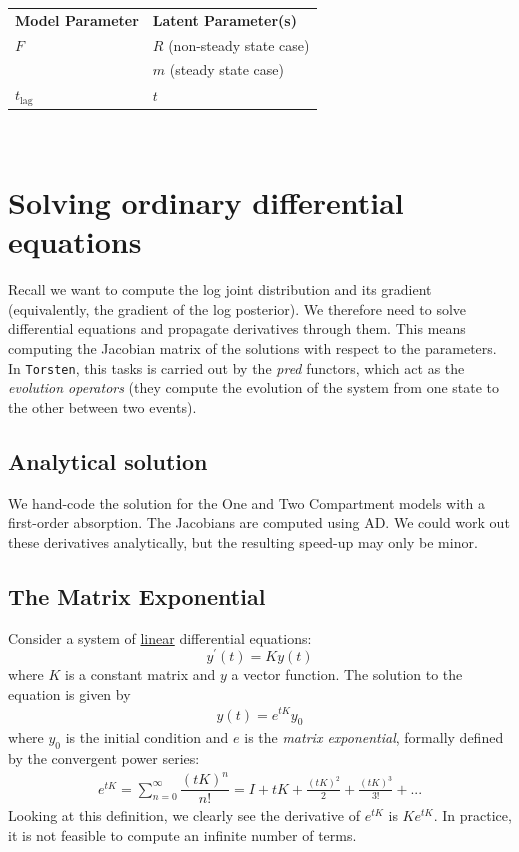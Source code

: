 \documentclass[11pt]{article}
\begin{document}
\begin{center}
  \begin{tabular}{l l}
  \rowcolor[gray]{0.95} \textbf{Model Parameter} & \textbf{Latent Parameter(s)} \\
    $F$ & $R$ (non-steady state case) \\
         &  $m$  (steady state case) \\ 
  \rowcolor[gray]{0.95} $t_\mathrm{lag}$ & $t$ \\
  \end{tabular} \\
\end{center}


\section{Solving ordinary differential equations}

Recall we want to compute the log joint distribution and its gradient (equivalently,
the gradient of the log posterior). We therefore need to solve differential equations and propagate 
derivatives through them.
%
This means computing the Jacobian matrix of the solutions with
respect to the parameters. In \texttt{Torsten}, this tasks is carried out by the \textit{pred} functors,
which act as the \textit{evolution operators} (they compute the evolution of the system from
one state to the other between two events).

\subsection{Analytical solution}

We hand-code the solution for the One and Two Compartment models with a first-order
absorption. The Jacobians are computed using AD.
We could work out these derivatives analytically, but the resulting speed-up may
only be minor. 

\subsection{The Matrix Exponential}

Consider a system of \underline{linear} differential equations:
%
$$ y^\prime(t) = Ky(t) $$
%
where $K$ is a constant matrix and $y$ a vector function. The solution to the equation is given by 
%
\begin{eqnarray}
  y(t) = e^{tK} y_0
  \label{eq:linearSol}
\end{eqnarray}
%
where $y_0$ is the initial condition and $e$ is the \textit{matrix exponential}, formally defined
by the convergent power series:
%
\begin{eqnarray}
  e^{tK} = \sum_{n=0}^{\infty} \dfrac{(tK)^n}{n!} = I + tK + \frac{(tK)^2}{2} + \frac{(tK)^3}{3!} + ...
  \label{eq:matrix_exp}
\end{eqnarray}
%
Looking at this definition, we clearly see the derivative of $e^{tK}$ is $Ke^{tK}$.
In practice, it is not feasible to compute an infinite number of terms.
\end{document}
